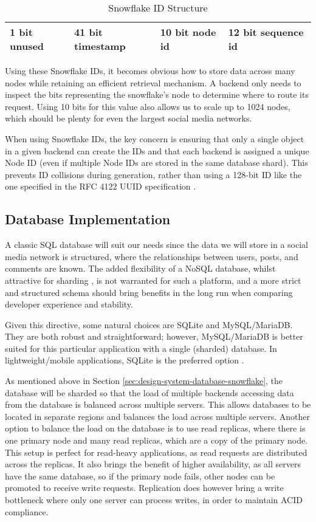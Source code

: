 \begin{table}[htbp]
\centering
\begin{tabular}{|l|l|l|l|}
\hline
1 bit unused & 41 bit timestamp & 10 bit node id & 12 bit sequence id \\ \hline
\end{tabular}
\caption{Snowflake ID Structure}
\label{tab:snowflake}
\end{table}

Using these Snowflake IDs, it becomes obvious how to store data across many nodes while retaining an efficient retrieval mechanism. A backend only needs to inspect the bits representing the snowflake's node to determine where to route its request. Using 10 bits for this value also allows us to scale up to 1024 nodes, which should be plenty for even the largest social media networks.

When using Snowflake IDs, the key concern is ensuring that only a single object in a given backend can create the IDs and that each backend is assigned a unique Node ID (even if multiple Node IDs are stored in the same database shard). 
This prevents ID collisions during generation, rather than using a 128-bit ID like the one specified in the RFC 4122 UUID specification \citep{rfc4122}.

\subsection{Database Implementation}
\label{sec:design-system-database-implementation}
A classic SQL database will suit our needs since the data we will store in a social media network is structured, where the relationships between users, posts, and comments are known.
The added flexibility of a NoSQL database, whilst attractive for sharding \citep{gupta2017nosql}, is not warranted for such a platform, and a more strict and structured schema should bring benefits in the long run when comparing developer experience and stability.

Given this directive, some natural choices are SQLite and MySQL/MariaDB. They are both robust and straightforward; however, MySQL/MariaDB is better suited for this particular application with a single (sharded) database. 
In lightweight/mobile applications, SQLite is the preferred option \citep{feiler2015understanding}.

As mentioned above in Section \ref{sec:design-system-database-snowflake}, the database will be sharded so that the load of multiple backends accessing data from the database is balanced across multiple servers. 
This allows databases to be located in separate regions and balances the load across multiple servers.
Another option to balance the load on the database is to use read replicas, where there is one primary node and many read replicas, which are a copy of the primary node.
This setup is perfect for read-heavy applications, as read requests are distributed across the replicas.
It also brings the benefit of higher availability, as all servers have the same database, so if the primary node fails, other nodes can be promoted to receive write requests.
Replication does however bring a write bottleneck where only one server can process writes, in order to maintain ACID compliance. 

